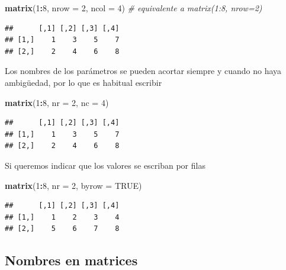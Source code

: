 \documentclass[]{book}
\newenvironment{Shaded}{\begin{snugshade}}{\end{snugshade}}
\newcommand{\CommentTok}[1]{\textcolor[rgb]{0.56,0.35,0.01}{\textit{#1}}}
\newcommand{\DataTypeTok}[1]{\textcolor[rgb]{0.13,0.29,0.53}{#1}}
\newcommand{\DecValTok}[1]{\textcolor[rgb]{0.00,0.00,0.81}{#1}}
\newcommand{\KeywordTok}[1]{\textcolor[rgb]{0.13,0.29,0.53}{\textbf{#1}}}
\newcommand{\NormalTok}[1]{#1}
\newcommand{\OperatorTok}[1]{\textcolor[rgb]{0.81,0.36,0.00}{\textbf{#1}}}
\newcommand{\OtherTok}[1]{\textcolor[rgb]{0.56,0.35,0.01}{#1}}
\begin{document}
\begin{Shaded}
\begin{Highlighting}[]
\KeywordTok{matrix}\NormalTok{(}\DecValTok{1}\OperatorTok{:}\DecValTok{8}\NormalTok{, }\DataTypeTok{nrow =} \DecValTok{2}\NormalTok{, }\DataTypeTok{ncol =} \DecValTok{4}\NormalTok{)  }\CommentTok{# equivalente a matrix(1:8, nrow=2)}
\end{Highlighting}
\end{Shaded}

\begin{verbatim}
##      [,1] [,2] [,3] [,4]
## [1,]    1    3    5    7
## [2,]    2    4    6    8
\end{verbatim}

Los nombres de los parámetros se pueden acortar siempre y cuando no haya
ambigüedad, por lo que es habitual escribir

\begin{Shaded}
\begin{Highlighting}[]
\KeywordTok{matrix}\NormalTok{(}\DecValTok{1}\OperatorTok{:}\DecValTok{8}\NormalTok{, }\DataTypeTok{nr =} \DecValTok{2}\NormalTok{, }\DataTypeTok{nc =} \DecValTok{4}\NormalTok{)}
\end{Highlighting}
\end{Shaded}

\begin{verbatim}
##      [,1] [,2] [,3] [,4]
## [1,]    1    3    5    7
## [2,]    2    4    6    8
\end{verbatim}

Si queremos indicar que los valores se escriban por filas

\begin{Shaded}
\begin{Highlighting}[]
\KeywordTok{matrix}\NormalTok{(}\DecValTok{1}\OperatorTok{:}\DecValTok{8}\NormalTok{, }\DataTypeTok{nr =} \DecValTok{2}\NormalTok{, }\DataTypeTok{byrow =} \OtherTok{TRUE}\NormalTok{)}
\end{Highlighting}
\end{Shaded}

\begin{verbatim}
##      [,1] [,2] [,3] [,4]
## [1,]    1    2    3    4
## [2,]    5    6    7    8
\end{verbatim}

\hypertarget{nombres-en-matrices}{%
\subsection{Nombres en matrices}\label{nombres-en-matrices}}
\end{document}
